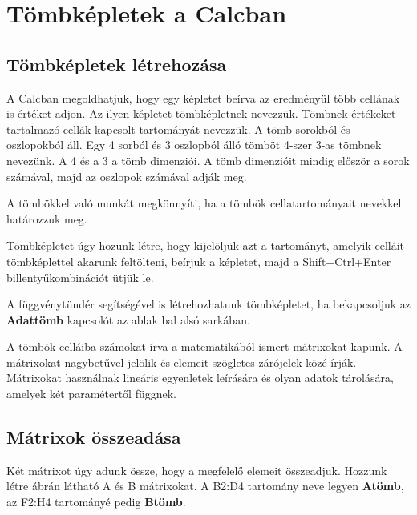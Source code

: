 \chapter{Tömbképletek a Calcban}
\thispagestyle{empty}

\section{Tömbképletek létrehozása}

A Calcban megoldhatjuk, hogy egy képletet beírva az eredményül
több cellának is értéket adjon. Az ilyen képletet
tömbképletnek nevezzük. Tömbnek értékeket tartalmazó
cellák kapcsolt tartományát nevezzük. A tömb sorokból és
oszlopokból áll. Egy 4 sorból és 3 oszlopból álló
tömböt 4-szer 3-as tömbnek nevezünk. A 4 és a 3 a tömb
dimenziói. A tömb dimenzióit mindig először a sorok
számával, majd az oszlopok számával adják meg.

A tömbökkel való munkát megkönnyíti, ha a tömbök
cellatartományait nevekkel határozzuk meg.

Tömbképletet úgy hozunk létre, hogy kijelöljük azt a
tartományt, amelyik celláit tömbképlettel akarunk feltölteni,
beírjuk a képletet, majd a Shift+Ctrl+Enter
billentyűkombinációt ütjük le.

A függvénytündér segítségével is létrehozhatunk
tömbképletet, ha bekapcsoljuk az \textbf{Adattömb} kapcsolót az
ablak bal alsó sarkában. 

A tömbök celláiba számokat írva a matematikából ismert
mátrixokat kapunk. A mátrixokat nagybetűvel jelölik és
elemeit szögletes zárójelek közé írják. Mátrixokat
használnak lineáris egyenletek leírására és olyan adatok
tárolására, amelyek két paramétertől függnek.


\section{Mátrixok összeadása}

Két mátrixot úgy adunk össze, hogy a megfelelő elemeit
összeadjuk. Hozzunk létre  ábrán látható
A és B mátrixokat. A B2:D4 tartomány neve legyen \textbf{Atömb}, az
F2:H4 tartományé pedig \textbf{Btömb}.

